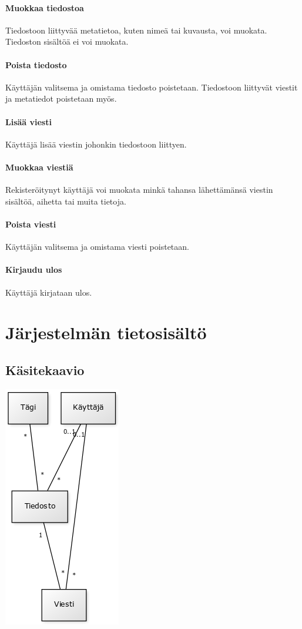 \documentclass[10pt,a4paper]{article}
\begin{document}
\paragraph{Muokkaa tiedostoa}
Tiedostoon liittyvää metatietoa, kuten nimeä tai kuvausta, voi muokata. Tiedoston sisältöä ei voi muokata.
\paragraph{Poista tiedosto}
Käyttäjän valitsema ja omistama tiedosto poistetaan. Tiedostoon liittyvät viestit ja metatiedot poistetaan myös.

\paragraph{Lisää viesti}
Käyttäjä lisää viestin johonkin tiedostoon liittyen.
\paragraph{Muokkaa viestiä}
Rekisteröitynyt käyttäjä voi muokata minkä tahansa lähettämänsä viestin sisältöä, aihetta tai muita tietoja.
\paragraph{Poista viesti}
Käyttäjän valitsema ja omistama viesti poistetaan.

\paragraph{Kirjaudu ulos}
Käyttäjä kirjataan ulos.

\section{Järjestelmän tietosisältö}
\subsection{Käsitekaavio}
\includegraphics[scale=0.7]{kaaviot/kasitekaavio.png}
\end{document}
